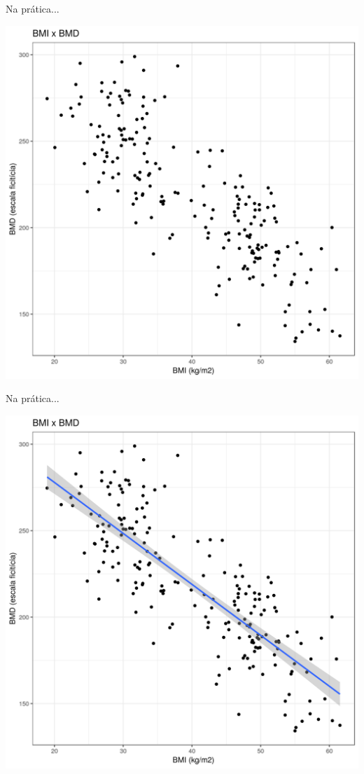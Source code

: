 \documentclass{beamer}
\begin{document}
\begin{frame}{\scriptsize Na prática...}
  \begin{center}
    \includegraphics[height=.9\textheight]{Cap18-19/pratica-rls1}
  \end{center}
\end{frame}

\begin{frame}[label=plot2]{\scriptsize Na prática...}
  \begin{center}
    \includegraphics[height=.9\textheight]{Cap18-19/pratica-rls2}
  \end{center}
\end{frame}
\end{document}
